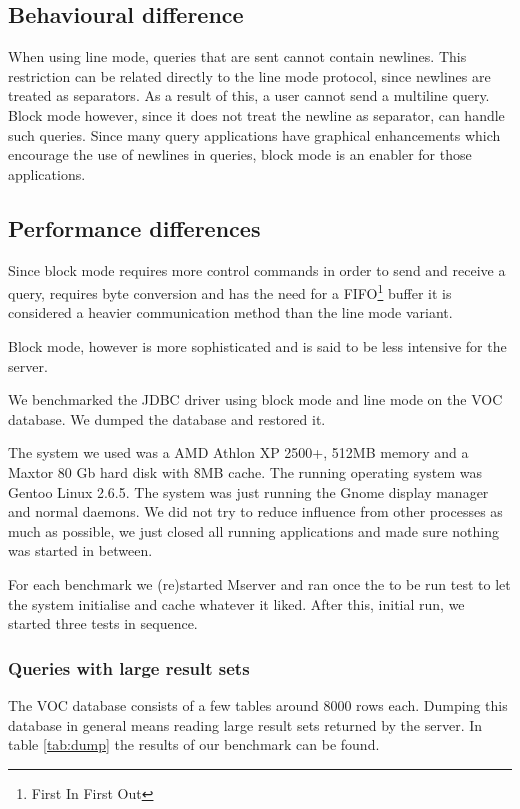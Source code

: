 \documentclass{article}
\begin{document}
\subsection{Behavioural difference}

When using line mode, queries that are sent cannot contain newlines.
This restriction can be related directly to the line mode protocol, since
newlines are treated as separators. As a result of this, a user cannot
send a multiline query. Block mode however, since it does not treat
the newline as separator, can handle such queries. Since many
query applications have graphical enhancements which encourage
the use of newlines in queries, block mode is an enabler for those
applications.


\subsection{Performance differences}

Since block mode requires more control commands in order to send and
receive a query, requires byte conversion and has the need for a
FIFO\footnote{First In First Out} buffer it is considered a heavier
communication method than the line mode variant.

Block mode, however is more sophisticated and is said to be less
intensive for the server.

We benchmarked the JDBC driver using block mode and line mode on
the VOC database. We dumped the database and restored it.

The system we used was a AMD Athlon XP 2500+, 512MB memory
and a Maxtor 80 Gb hard disk with 8MB cache. The running operating
system was Gentoo Linux 2.6.5. The system was just running the
Gnome display manager and normal daemons. We did not try to
reduce influence from other processes as much as possible, we just
closed all running applications and made sure nothing was started
in between.

For each benchmark we (re)started Mserver and ran once the to be
run test to let the system initialise and cache whatever it liked.
After this, initial run, we started three tests in sequence.
 

\subsubsection{Queries with large result sets}

The VOC database consists of a few tables around 8000 rows each.
Dumping this database in general means reading large result sets
returned by the server. In table \ref{tab:dump} the results of our
benchmark can be found.
\end{document}
